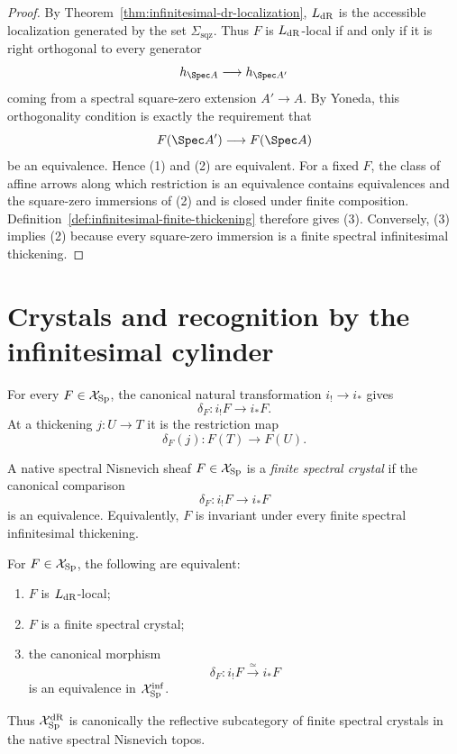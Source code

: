 \begin{proof}
By Theorem~\ref{thm:infinitesimal-dr-localization}, $L_{\mathrm{dR}}$ is the
accessible localization generated by the set
$\Sigma_{\mathrm{sqz}}$.  Thus $F$ is $L_{\mathrm{dR}}$-local if and only if it is
right orthogonal to every generator
\[
    h_{\Spec A}\longrightarrow h_{\Spec A'}
\]
coming from a spectral square-zero extension $A'\to A$.  By Yoneda, this
orthogonality condition is exactly the requirement that
\[
    F(\Spec A')\longrightarrow F(\Spec A)
\]
be an equivalence.  Hence (1) and (2) are equivalent.  For a fixed \(F\), the class of affine
arrows along which restriction is an equivalence contains equivalences and
the square-zero immersions of (2) and is closed under finite composition.
Definition~\ref{def:infinitesimal-finite-thickening} therefore gives (3).
Conversely, (3) implies (2) because every square-zero immersion is a finite
spectral infinitesimal thickening.
\end{proof}

\section{Crystals and recognition by the infinitesimal cylinder}
\label{sec:infinitesimal-dr-recognition}

For every $F\in\mathcal X_{\mathrm{Sp}}$, the canonical natural transformation
$i_!\to i_*$ gives
\[
    \delta_F:i_!F\longrightarrow i_*F.
\]
At a thickening $j:U\to T$ it is the restriction map
\[
    \delta_F(j):F(T)\longrightarrow F(U).
\]

\begin{definition}
\label{def:infinitesimal-finite-crystal}
A native spectral Nisnevich sheaf $F\in\mathcal X_{\mathrm{Sp}}$ is a
\emph{finite spectral crystal} if the canonical comparison
\[
    \delta_F:i_!F\longrightarrow i_*F
\]
is an equivalence.  Equivalently, $F$ is invariant under every finite spectral
infinitesimal thickening.
\end{definition}

\begin{theorem}
\label{thm:infinitesimal-dr-recognition}
For $F\in\mathcal X_{\mathrm{Sp}}$, the following are equivalent:
\begin{enumerate}
\item $F$ is $L_{\mathrm{dR}}$-local;
\item $F$ is a finite spectral crystal;
\item the canonical morphism
\[
    \boxed{
    \delta_F:i_!F\xrightarrow{\simeq}i_*F
    }
\]
is an equivalence in $\mathcal X_{\mathrm{Sp}}^{\mathrm{inf}}$.
\end{enumerate}
Thus $\mathcal X_{\mathrm{Sp}}^{\mathrm{dR}}$ is canonically the reflective subcategory of
finite spectral crystals in the native spectral Nisnevich topos.
\end{theorem}


